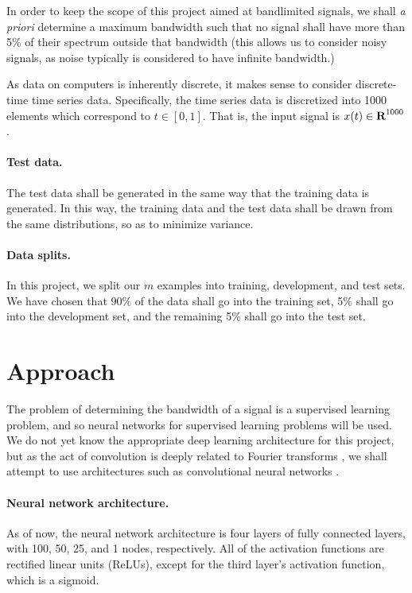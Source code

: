 \documentclass[12pt]{article}
\begin{document}
In order to keep the scope of this project aimed at bandlimited signals, we shall \textit{a priori}
determine a maximum bandwidth such that no signal shall have more than 5\% of their spectrum outside
that bandwidth (this allows us to consider noisy signals, as noise typically is considered to have 
infinite bandwidth.)

As data on computers is inherently discrete, it makes sense to consider discrete-time time series data.
Specifically, the time series data is discretized into 1000 elements which correspond to $t \in [0,1]$. 
That is, the input signal is $x(t) \in {\mbox{\bf R}}^{1000}$.

\paragraph{Test data.} The test data shall be generated in the same way that the training data is
generated. In this way, the training data and the test data shall be drawn from the same distributions,
so as to minimize variance.

\paragraph{Data splits.} In this project, we split our $m$ examples into training, development, and test
sets. We have chosen that 90\% of the data shall go into the training set, 5\% shall go into the 
development set, and the remaining 5\% shall go into the test set.

\section{Approach}
The problem of determining the bandwidth of a signal is a supervised learning problem, and so
neural networks for supervised learning problems will be used. We do not yet know the appropriate
deep learning architecture for this project, but as the act of convolution is deeply related to Fourier 
transforms \cite{B:78,O:17}, we shall attempt to use architectures such as convolutional neural networks 
\cite{LBBH:98,RSA:15}.

\paragraph{Neural network architecture.} As of now, the neural network architecture is four layers of 
fully connected layers, with 100, 50, 25, and 1 nodes, respectively. All of the activation functions are
rectified linear units (ReLUs), except for the third layer's activation function, which is a sigmoid.
\end{document}
